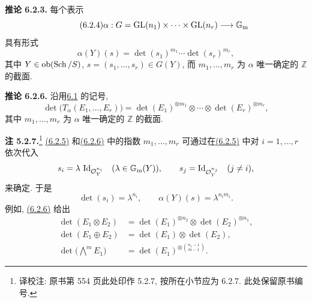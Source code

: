 \textbf{推论 6.2.3.} 每个表示
%
\begin{equation}\tag{6.2.4}
\alpha:G=\operatorname{GL}(n_1)\times\cdots\times\operatorname{GL}(n_r)\longrightarrow\mathbb G_{\mathrm m}
\end{equation}
具有形式
\begin{equation}\tag{6.2.5}
\alpha(Y)(s)=\det(s_1)^{m_1}\cdots\det(s_r)^{m_r},
\end{equation}
其中 $Y\in\operatorname{ob}(\operatorname{Sch}/S)$, $s=(s_1,\ldots,s_r)\in G(Y)$, 而 $m_1,\ldots,m_r$ 为 $\alpha$ 唯一确定的 $\mathbb Z$ 的截面.
%
%

\textbf{推论 6.2.6.} 沿用\hyperlink{sga6.e10.sec.6.1}{6.1} 的记号,
%
\begin{equation}\tag{6.2.6}
\det\bigl(T_\alpha(E_1,\ldots,E_r)\bigr)
=\det(E_1)^{\otimes m_1}\otimes\cdots\otimes
\det(E_r)^{\otimes m_r},
\end{equation}
其中 $m_1,\ldots,m_r$ 为 $\alpha$ 唯一确定的 $\mathbb Z$ 的截面.
%

\textbf{注 5.2.7.}\footnote{译校注: 原书第 554 页此处印作 5.2.7, 按所在小节应为 6.2.7. 此处保留原书编号.} \hyperlink{sga6.e10.eq.6-2-5}{(6.2.5)} 和\hyperlink{sga6.e10.eq.6-2-6}{(6.2.6)} 中的指数 $m_1,\ldots,m_r$ 可通过在\hyperlink{sga6.e10.eq.6-2-5}{(6.2.5)} 中对 $i=1,\ldots,r$ 依次代入
%
%
\[
s_i=\lambda\,\operatorname{Id}_{\mathcal O_Y^{n_i}}\quad(\lambda\in\mathbb G_{\mathrm m}(Y)),
\qquad
s_j=\operatorname{Id}_{\mathcal O_Y^{n_j}}\quad(j\ne i),
\]
来确定. 于是
\[
\det(s_i)=\lambda^{n_i},
\qquad
\alpha(Y)(s)=\lambda^{n_i m_i}.
\]
例如, \hyperlink{sga6.e10.eq.6-2-6}{(6.2.6)} 给出
\begin{align}
\det(E_1\otimes E_2)
&=\det(E_1)^{\otimes n_2}\otimes\det(E_2)^{\otimes n_1},
\tag{6.2.8}\\
\det(E_1\oplus E_2)
&=\det(E_1)\otimes\det(E_2),
\tag{6.2.9}\\
\det\bigl(\bigwedge\nolimits^m E_1\bigr)
&=\det(E_1)^{\otimes\binom{n_1-1}{m-1}}.
\tag{6.2.10}
\end{align}

